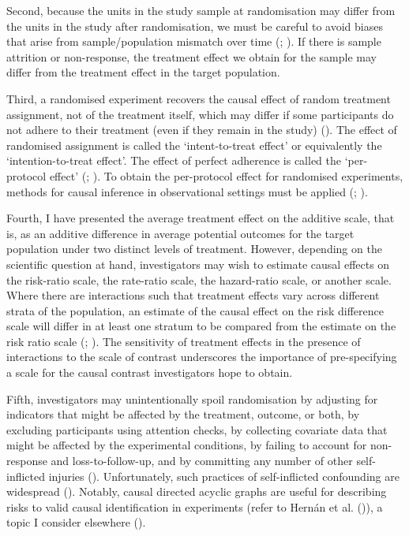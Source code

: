 \documentclass[
  single column]{article}
\begin{document}
Second, because the units in the study sample at randomisation may
differ from the units in the study after randomisation, we must be
careful to avoid biases that arise from sample/population mismatch over
time (;
). If there is
sample attrition or non-response, the treatment effect we obtain for the
sample may differ from the treatment effect in the target population.

Third, a randomised experiment recovers the causal effect of random
treatment assignment, not of the treatment itself, which may differ if
some participants do not adhere to their treatment (even if they remain
in the study) (). The
effect of randomised assignment is called the `intent-to-treat effect'
or equivalently the `intention-to-treat effect'. The effect of perfect
adherence is called the `per-protocol effect'
(;
). To obtain the per-protocol
effect for randomised experiments, methods for causal inference in
observational settings must be applied
(;
).

Fourth, I have presented the average treatment effect on the additive
scale, that is, as an additive difference in average potential outcomes
for the target population under two distinct levels of treatment.
However, depending on the scientific question at hand, investigators may
wish to estimate causal effects on the risk-ratio scale, the rate-ratio
scale, the hazard-ratio scale, or another scale. Where there are
interactions such that treatment effects vary across different strata of
the population, an estimate of the causal effect on the risk difference
scale will differ in at least one stratum to be compared from the
estimate on the risk ratio scale
(;
). The sensitivity of
treatment effects in the presence of interactions to the scale of
contrast underscores the importance of pre-specifying a scale for the
causal contrast investigators hope to obtain.

Fifth, investigators may unintentionally spoil randomisation by
adjusting for indicators that might be affected by the treatment,
outcome, or both, by excluding participants using attention checks, by
collecting covariate data that might be affected by the experimental
conditions, by failing to account for non-response and
loss-to-follow-up, and by committing any number of other self-inflicted
injuries ().
Unfortunately, such practices of self-inflicted confounding are
widespread ().
Notably, causal directed acyclic graphs are useful for describing risks
to valid causal identification in experiments (refer to Hernán et al.
()), a topic I consider elsewhere
().
\end{document}
